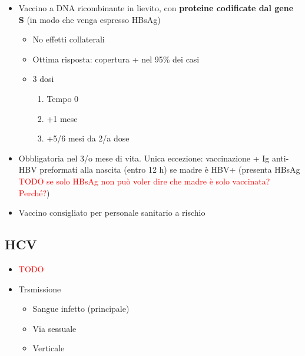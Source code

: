 \documentclass[italian,]{article}
\providecommand{\tightlist}{%
  \setlength{\itemsep}{0pt}\setlength{\parskip}{0pt}}
\newcommand{\TODO}[1]{\textcolor{red}{\textsf{\footnotesize{TODO #1}}}} %
\begin{document}
\begin{itemize}
\tightlist
\item
  Vaccino a DNA ricombinante in lievito, con \textbf{proteine codificate
  dal gene S} (in modo che venga espresso HBsAg)

  \begin{itemize}
  \tightlist
  \item
    No effetti collaterali
  \item
    Ottima risposta: copertura + nel 95\% dei casi
  \item
    3 dosi

    \begin{enumerate}
    \def\labelenumi{\arabic{enumi}.}
    \tightlist
    \item
      Tempo 0
    \item
      +1 mese
    \item
      +5/6 mesi da 2/a dose
    \end{enumerate}
  \end{itemize}
\item
  Obbligatoria nel 3/o mese di vita. Unica eccezione: vaccinazione + Ig
  anti-HBV preformati alla nascita (entro 12 h) se madre è HBV+
  (presenta HBsAg
  \TODO{se solo HBsAg non può voler dire che madre è solo vaccinata? Perché?})
\item
  Vaccino consigliato per personale sanitario a rischio
\end{itemize}

\hypertarget{hcv}{%
\subsection{HCV}\label{hcv}}

\begin{itemize}
\item
  \TODO{}
\item
  Trsmissione

  \begin{itemize}
  \tightlist
  \item
    Sangue infetto (principale)
  \item
    Via sessuale
  \item
    Verticale
  \end{itemize}
\end{itemize}
\end{document}
